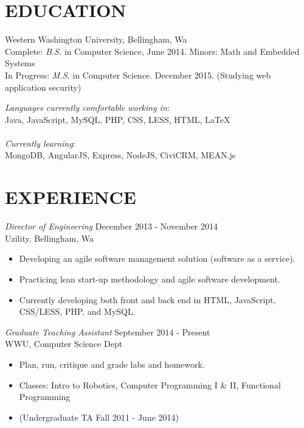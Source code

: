 \documentclass[line,margin]{res}
\begin{document}
\address{835 N State St. Apt 310 Bellingham, WA 98225}
\address{(425) 241-7977 \hspace{13mm} kyle.rader@ieee.org}

\begin{resume}
 
\section{EDUCATION}   Western Washington University, Bellingham, Wa\\
			    Complete: {\sl B.S.} in Computer Science, June 2014. Minors: Math and Embedded Systems\\
			    In Progress: {\sl M.S.} in Computer Science. December 2015. (Studying web application security)	  
			          	      
		{\sl Languages currently comfortable working in}: \\
		Java, JavaScript, MySQL, PHP, CSS, LESS, HTML, {\LaTeX}\\
		\vspace{-.1cm} \\
		{\sl Currently learning}: \\
		MongoDB, AngularJS, Express, NodeJS, CiviCRM, MEAN.js

\section{EXPERIENCE}

		{\sl Director of Engineering} \hfill December 2013 - November 2014 \\
                	Uzility, Bellingham, Wa
               	 \begin{itemize}  \itemsep -2pt
                		\item Developing an agile software management solution (software as a service).
                		\item Practicing lean start-up methodology and agile software development. 
                		\item Currently developing both front and back end in HTML, JavaScript, CSS/LESS, PHP, and MySQL.
                	\end{itemize}

                	{\sl Graduate Teaching Assistant} \hfill        September 2014 - Present \\
                	WWU, Computer Science Dept
                  	\begin{itemize} \itemsep -2pt
                   		\item Plan, run, critique and grade labs and homework.
			\item Classes: Intro to Robotics, Computer Programming I \& II, Functional Programming
			\item (Undergraduate TA Fall 2011 - June 2014)
                   	\end{itemize}


\end{resume}
\end{document}
